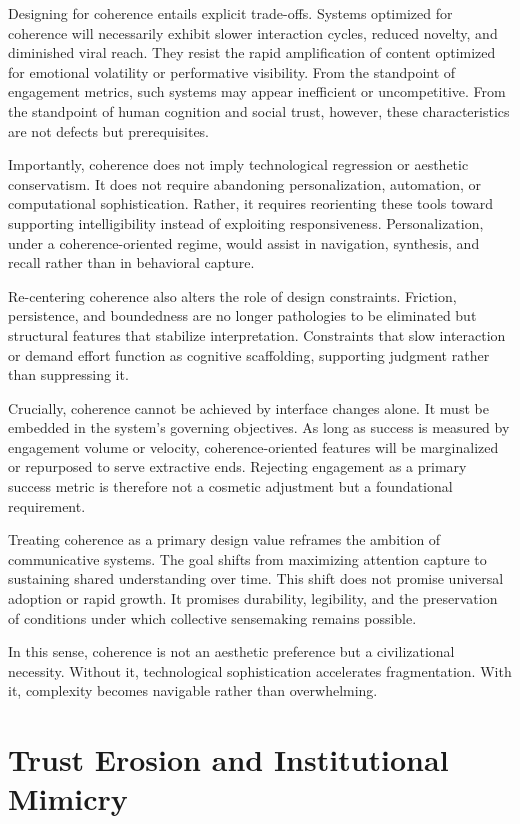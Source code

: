 \documentclass[12pt]{article}
\begin{document}
Designing for coherence entails explicit trade-offs. Systems optimized for coherence will necessarily exhibit slower interaction cycles, reduced novelty, and diminished viral reach. They resist the rapid amplification of content optimized for emotional volatility or performative visibility. From the standpoint of engagement metrics, such systems may appear inefficient or uncompetitive. From the standpoint of human cognition and social trust, however, these characteristics are not defects but prerequisites.

Importantly, coherence does not imply technological regression or aesthetic conservatism. It does not require abandoning personalization, automation, or computational sophistication. Rather, it requires reorienting these tools toward supporting intelligibility instead of exploiting responsiveness. Personalization, under a coherence-oriented regime, would assist in navigation, synthesis, and recall rather than in behavioral capture.

Re-centering coherence also alters the role of design constraints. Friction, persistence, and boundedness are no longer pathologies to be eliminated but structural features that stabilize interpretation. Constraints that slow interaction or demand effort function as cognitive scaffolding, supporting judgment rather than suppressing it.

Crucially, coherence cannot be achieved by interface changes alone. It must be embedded in the system’s governing objectives. As long as success is measured by engagement volume or velocity, coherence-oriented features will be marginalized or repurposed to serve extractive ends. Rejecting engagement as a primary success metric is therefore not a cosmetic adjustment but a foundational requirement.

Treating coherence as a primary design value reframes the ambition of communicative systems. The goal shifts from maximizing attention capture to sustaining shared understanding over time. This shift does not promise universal adoption or rapid growth. It promises durability, legibility, and the preservation of conditions under which collective sensemaking remains possible.

In this sense, coherence is not an aesthetic preference but a civilizational necessity. Without it, technological sophistication accelerates fragmentation. With it, complexity becomes navigable rather than overwhelming.

\section{Trust Erosion and Institutional Mimicry}
\end{document}
